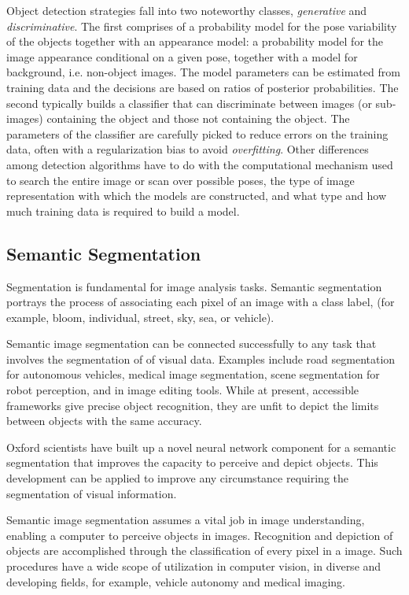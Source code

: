 Object detection strategies fall into two noteworthy classes, \textit{generative} and \textit{discriminative}. The first comprises of a  probability model for the pose variability of the objects together with an appearance model:
a probability model for the image appearance conditional on a given pose, together with a model for
background, i.e. non-object images. The model parameters can be estimated from training data and the
decisions are based on ratios of posterior probabilities. The second typically builds a classifier that can
discriminate between images (or sub-images) containing the object and those not containing the object.
The parameters of the classifier are carefully picked to reduce errors on the training data, often with a
regularization bias to avoid \textit{ overfitting}. Other differences among detection algorithms have to do with
the computational mechanism used to search the entire image or scan over possible poses, the type of image
representation with which the models are constructed, and what type and how much training data is
required to build a model.


\subsection{
Semantic Segmentation
}
Segmentation is fundamental for image analysis tasks. Semantic segmentation portrays the process of associating
each pixel of an image with a class label,  (for example, bloom, individual, street, sky, sea, or vehicle). 

Semantic image segmentation can be connected successfully to any task that involves the segmentation of of visual data. Examples include road segmentation for autonomous vehicles, medical image segmentation, scene segmentation for robot perception, and in image editing tools. While at present, accessible frameworks give precise object recognition, they are unfit to depict the limits between objects with the same accuracy. 

Oxford scientists have built up a novel neural network component  for a semantic segmentation that improves the capacity to perceive and depict objects. This development can be applied to improve any circumstance requiring the segmentation of visual information. 

Semantic image segmentation assumes a vital job in image understanding, enabling a computer to perceive objects in images. Recognition and depiction of objects are accomplished through the classification of every pixel in a image. Such procedures have a wide scope of utilization in computer vision, in diverse and developing fields, for example, vehicle autonomy and medical imaging. 

